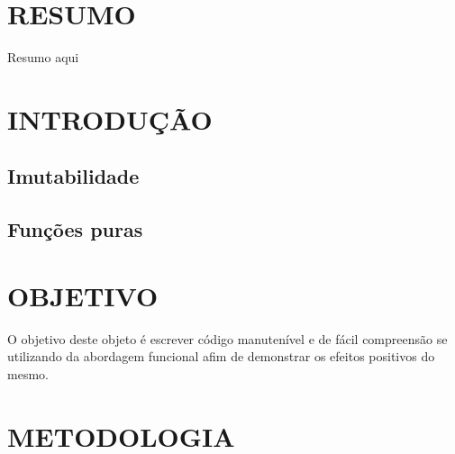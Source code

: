 \documentclass[date,twocolumn,a4paper]{ppgem}
\begin{document}
    \thispagestyle{plain}
    \makeheader




    \section*{RESUMO}
    Resumo aqui

    \section{INTRODUÇÃO}
    \subsection{Imutabilidade}
    \subsection{Funções puras}

    \section{OBJETIVO}
    O objetivo deste objeto é escrever código manutenível e de fácil compreensão se utilizando da abordagem funcional
    afim de demonstrar os efeitos positivos do mesmo.

    \section{METODOLOGIA}
\end{document}
